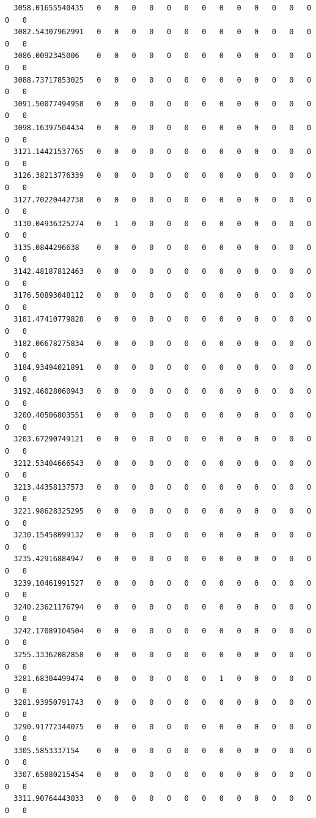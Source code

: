\documentclass[
  letterpaper,
  DIV=11,
  numbers=noendperiod]{scrartcl}
\begin{document}
\begin{verbatim}
  3058.01655540435   0   0   0   0   0   0   0   0   0   0   0   0   0   0   0
  3082.54307962991   0   0   0   0   0   0   0   0   0   0   0   0   0   0   0
  3086.0092345006    0   0   0   0   0   0   0   0   0   0   0   0   0   0   0
  3088.73717853025   0   0   0   0   0   0   0   0   0   0   0   0   0   0   0
  3091.50077494958   0   0   0   0   0   0   0   0   0   0   0   0   0   0   0
  3098.16397504434   0   0   0   0   0   0   0   0   0   0   0   0   0   0   0
  3121.14421537765   0   0   0   0   0   0   0   0   0   0   0   0   0   0   0
  3126.38213776339   0   0   0   0   0   0   0   0   0   0   0   0   0   0   0
  3127.70220442738   0   0   0   0   0   0   0   0   0   0   0   0   0   0   0
  3130.04936325274   0   1   0   0   0   0   0   0   0   0   0   0   0   0   0
  3135.0844296638    0   0   0   0   0   0   0   0   0   0   0   0   0   0   0
  3142.48187812463   0   0   0   0   0   0   0   0   0   0   0   0   0   0   0
  3176.50893048112   0   0   0   0   0   0   0   0   0   0   0   0   0   0   0
  3181.47410779828   0   0   0   0   0   0   0   0   0   0   0   0   0   0   0
  3182.06678275834   0   0   0   0   0   0   0   0   0   0   0   0   0   0   0
  3184.93494021891   0   0   0   0   0   0   0   0   0   0   0   0   0   0   0
  3192.46028060943   0   0   0   0   0   0   0   0   0   0   0   0   0   0   0
  3200.40506803551   0   0   0   0   0   0   0   0   0   0   0   0   0   0   0
  3203.67290749121   0   0   0   0   0   0   0   0   0   0   0   0   0   0   0
  3212.53404666543   0   0   0   0   0   0   0   0   0   0   0   0   0   0   0
  3213.44358137573   0   0   0   0   0   0   0   0   0   0   0   0   0   0   0
  3221.98628325295   0   0   0   0   0   0   0   0   0   0   0   0   0   0   0
  3230.15458099132   0   0   0   0   0   0   0   0   0   0   0   0   0   0   0
  3235.42916884947   0   0   0   0   0   0   0   0   0   0   0   0   0   0   0
  3239.10461991527   0   0   0   0   0   0   0   0   0   0   0   0   0   0   0
  3240.23621176794   0   0   0   0   0   0   0   0   0   0   0   0   0   0   0
  3242.17089104504   0   0   0   0   0   0   0   0   0   0   0   0   0   0   0
  3255.33362082858   0   0   0   0   0   0   0   0   0   0   0   0   0   0   0
  3281.68304499474   0   0   0   0   0   0   0   1   0   0   0   0   0   0   0
  3281.93950791743   0   0   0   0   0   0   0   0   0   0   0   0   0   0   0
  3290.91772344075   0   0   0   0   0   0   0   0   0   0   0   0   0   0   0
  3305.5853337154    0   0   0   0   0   0   0   0   0   0   0   0   0   0   0
  3307.65880215454   0   0   0   0   0   0   0   0   0   0   0   0   0   0   0
  3311.90764443033   0   0   0   0   0   0   0   0   0   0   0   0   0   0   0
                  

\end{verbatim}
\end{document}
